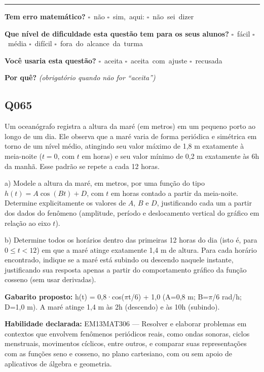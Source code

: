 \documentclass[11pt,a4paper]{article}
\begin{document}
\noindent\rule{\linewidth}{0.4pt}
\textbf{Tem erro matemático?}\quad
\mbox{$\square$~não} \quad \mbox{$\square$~sim, aqui:} \underline{\hspace{5cm}}
\quad \mbox{$\square$~não sei dizer}

\textbf{Que nível de dificuldade esta questão tem para os seus alunos?}\quad
\mbox{$\square$~fácil} \quad \mbox{$\square$~média} \quad
\mbox{$\square$~difícil} \quad \mbox{$\square$~fora do alcance da turma}

\textbf{Você usaria esta questão?}\quad
\mbox{$\square$~aceita} \quad \mbox{$\square$~aceita com ajuste} \quad
\mbox{$\square$~recusada}

\textbf{Por quê?} \emph{(obrigatório quando não for ``aceita'')}

\underline{\hspace{\linewidth}}

\underline{\hspace{\linewidth}}
\vspace{0.6em}

\begin{samepage}
\subsection*{Q065}
Um oceanógrafo registra a altura da maré (em metros) em um pequeno porto ao longo de um dia. Ele observa que a maré varia de forma periódica e simétrica em torno de um nível médio, atingindo seu valor máximo de 1,8 m exatamente à meia-noite ($t=0$, com $t$ em horas) e seu valor mínimo de 0,2 m exatamente às 6h da manhã. Esse padrão se repete a cada 12 horas.

a) Modele a altura da maré, em metros, por uma função do tipo $h(t) = A\cos(Bt) + D$, com $t$ em horas contado a partir da meia-noite. Determine explicitamente os valores de $A$, $B$ e $D$, justificando cada um a partir dos dados do fenômeno (amplitude, período e deslocamento vertical do gráfico em relação ao eixo $t$).

b) Determine todos os horários dentro das primeiras 12 horas do dia (isto é, para $0 \le t < 12$) em que a maré atinge exatamente 1,4 m de altura. Para cada horário encontrado, indique se a maré está subindo ou descendo naquele instante, justificando sua resposta apenas a partir do comportamento gráfico da função cosseno (sem usar derivadas).

\textbf{Gabarito proposto:} h(t) = 0,8·cos($\pi$t/6) + 1,0 (A=0,8 m; B=$\pi$/6 rad/h; D=1,0 m). A maré atinge 1,4 m às 2h (descendo) e às 10h (subindo).

\textbf{Habilidade declarada:} EM13MAT306 --- Resolver e elaborar problemas em contextos que envolvem fenômenos periódicos reais, como ondas sonoras, ciclos menstruais, movimentos cíclicos, entre outros, e comparar suas representações com as funções seno e cosseno, no plano cartesiano, com ou sem apoio de aplicativos de álgebra e geometria.
\end{samepage}
\end{document}
